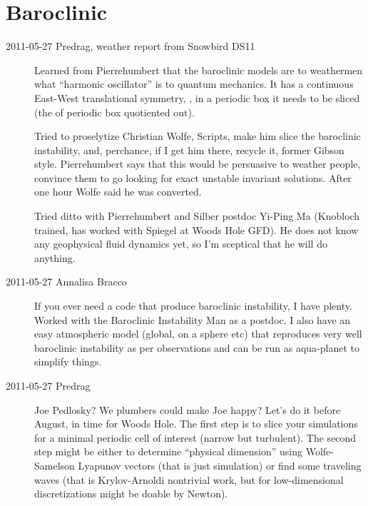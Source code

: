 
\chapter{Baroclinic}
\label{chap:baroclinic}

\begin{description}

\item[2011-05-27 Predrag, weather report from Snowbird DS11]
	\toCB
Learned from Pierrehumbert that the baroclinic models are to
weathermen what ``harmonic oscillator'' is to quantum mechanics. It has a
continuous East-West translational symmetry, \ie, in a periodic box it
needs to be sliced (the  of periodic box quotiented out).

Tried to proselytize Christian Wolfe, Scripts,  make him slice
the baroclinic instability, and, perchance, if I get him there, recycle
it, former Gibson style. Pierrehumbert says that this would be persuasive
to weather people, convince them to go looking for exact unstable
invariant solutions. After one hour Wolfe said he was converted.

Tried ditto with Pierrehumbert and Silber postdoc Yi-Ping Ma (Knobloch
trained, has worked with Spiegel at Woods Hole GFD). He does not know any
geophysical fluid dynamics yet, so I'm sceptical that he will do anything.

\item[2011-05-27 Annalisa Bracco]
If you ever need a code that produce baroclinic instability, I have plenty.
Worked with the Baroclinic Instability Man as a postdoc.
I also have an easy atmospheric model (global, on a sphere etc)
that reproduces very well baroclinic instability as per observations
and can be run as aqua-planet to simplify things.

\item[2011-05-27 Predrag]
Joe Pedlosky? We plumbers could make Joe happy?
Let's do it before August, in time for Woods Hole. The first step is to slice
your simulations for a minimal periodic cell of interest (narrow but turbulent).
The second step might be either to determine ``physical dimension'' using
Wolfe-Samelson Lyapunov vectors (that is just simulation) or find
some traveling waves (that is Krylov-Arnoldi nontrivial work,
but for low-dimensional discretizations might be doable by Newton).


\end{description}
